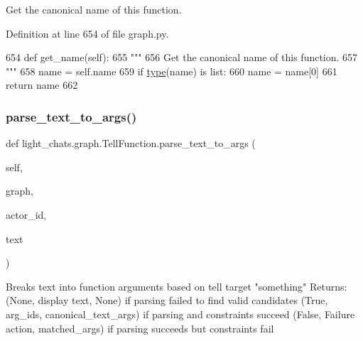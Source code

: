 \begin{DoxyVerb}Get the canonical name of this function.
\end{DoxyVerb}
 

Definition at line 654 of file graph.\+py.


\begin{DoxyCode}
654     \textcolor{keyword}{def }get\_name(self):
655         \textcolor{stringliteral}{"""}
656 \textcolor{stringliteral}{        Get the canonical name of this function.}
657 \textcolor{stringliteral}{        """}
658         name = self.name
659         \textcolor{keywordflow}{if} \hyperlink{namespaceparlai_1_1agents_1_1tfidf__retriever_1_1build__tfidf_ad5dfae268e23f506da084a9efb72f619}{type}(name) \textcolor{keywordflow}{is} list:
660             name = name[0]
661         \textcolor{keywordflow}{return} name
662 
\end{DoxyCode}
\mbox{\label{classlight__chats_1_1graph_1_1TellFunction_a88ac4115a6cca664cd220fb0b8852629}} 
\subsubsection{\texorpdfstring{parse\+\_\+text\+\_\+to\+\_\+args()}{parse\_text\_to\_args()}}
{\footnotesize\ttfamily def light\+\_\+chats.\+graph.\+Tell\+Function.\+parse\+\_\+text\+\_\+to\+\_\+args (\begin{DoxyParamCaption}\item[{}]{self,  }\item[{}]{graph,  }\item[{}]{actor\+\_\+id,  }\item[{}]{text }\end{DoxyParamCaption})}

\begin{DoxyVerb}Breaks text into function arguments based on tell target "something"
Returns:
(None, display text, None) if parsing failed to find valid candidates
(True, arg_ids, canonical_text_args) if parsing and constraints succeed
(False, Failure action, matched_args)
if parsing succeeds but constraints fail
\end{DoxyVerb}
 

